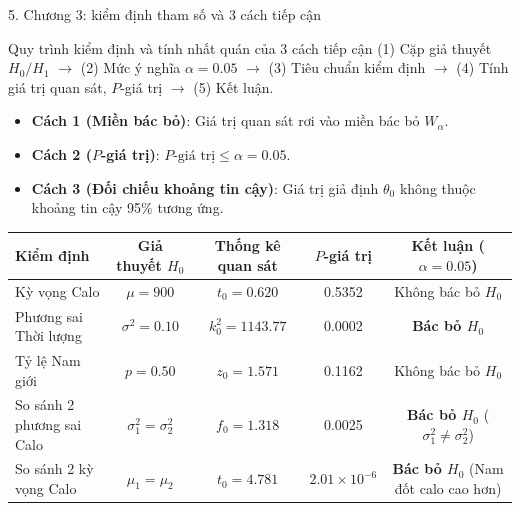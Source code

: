\documentclass[aspectratio=169, 10pt]{beamer}
\begin{document}
\begin{frame}{5. Chương 3: kiểm định tham số và 3 cách tiếp cận}
    \begin{block}{Quy trình kiểm định và tính nhất quán của 3 cách tiếp cận}
        \footnotesize
        (1) Cặp giả thuyết $H_0/H_1$ $\rightarrow$ (2) Mức ý nghĩa $\alpha = 0.05$ $\rightarrow$ (3) Tiêu chuẩn kiểm định $\rightarrow$ (4) Tính giá trị quan sát, $P$-giá trị $\rightarrow$ (5) Kết luận.
        \begin{itemize}
            \item \textbf{Cách 1 (Miền bác bỏ)}: Giá trị quan sát rơi vào miền bác bỏ $W_\alpha$.
            \item \textbf{Cách 2 ($P$-giá trị)}: $P\text{-giá trị} \le \alpha = 0.05$.
            \item \textbf{Cách 3 (Đối chiếu khoảng tin cậy)}: Giá trị giả định $\theta_0$ không thuộc khoảng tin cậy 95\% tương ứng.
        \end{itemize}
    \end{block}

    \begin{table}[H]
    \centering\scriptsize
    \begin{tabular}{@{}lcccc@{}}
    \toprule
    \textbf{Kiểm định} & \textbf{Giả thuyết $H_0$} & \textbf{Thống kê quan sát} & \textbf{$P$-giá trị} & \textbf{Kết luận ($\alpha = 0.05$)} \\
    \midrule
    Kỳ vọng Calo & $\mu = 900$ & $t_0 = 0.620$ & 0.5352 & Không bác bỏ $H_0$ \\
    Phương sai Thời lượng & $\sigma^2 = 0.10$ & $k_0^2 = 1143.77$ & 0.0002 & \textbf{Bác bỏ $H_0$} \\
    Tỷ lệ Nam giới & $p = 0.50$ & $z_0 = 1.571$ & 0.1162 & Không bác bỏ $H_0$ \\
    So sánh 2 phương sai Calo & $\sigma_1^2 = \sigma_2^2$ & $f_0 = 1.318$ & 0.0025 & \textbf{Bác bỏ $H_0$} ($\sigma_1^2 \ne \sigma_2^2$) \\
    So sánh 2 kỳ vọng Calo & $\mu_1 = \mu_2$ & $t_0 = 4.781$ & $2.01 \times 10^{-6}$ & \textbf{Bác bỏ $H_0$} (Nam đốt calo cao hơn) \\
    \bottomrule
    \end{tabular}
    \end{table}
\end{frame}
\end{document}
